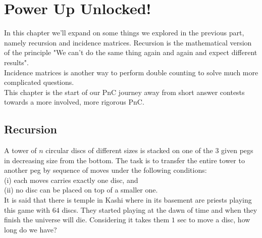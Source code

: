\chapter{Power Up Unlocked!}
In this chapter we'll expand on some things we explored in the previous part, namely recursion and incidence matrices. Recursion is the mathematical version of the principle "We can't do the same thing again and again and expect different results". \\
Incidence matrices is another way to perform double counting to solve much more complicated questions.\\
This chapter is the start of our PnC journey away from short answer contests towards a more involved, more rigorous PnC.
\section{Recursion}
\begin{example}
A tower of $n$ circular discs of different sizes is stacked on one of the 3 given pegs in decreasing size from the bottom. The task is to transfer the entire tower to another peg by sequence of moves under the
following conditions:\\ 
(i) each moves carries exactly one disc, and\\ 
(ii) no disc can be placed on top of a smaller one.\\
It is said that there is temple in Kashi where in its basement are priests playing this game with $64$ discs. They started playing at the dawn of time and when they finish the universe will die. Considering it takes them $1$ sec to move a disc, how long do we have?
\end{example}
